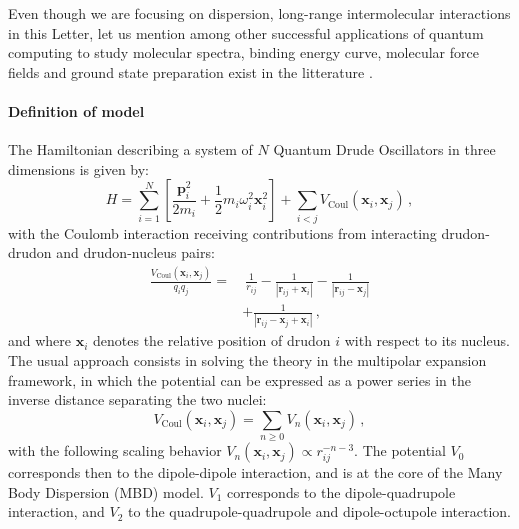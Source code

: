 \documentclass[reprint, amsmath, amssymb, floatfix, aps, pra]{revtex4-2}
\begin{document}
    Even though we are focusing on dispersion, long-range intermolecular interactions in this Letter, let us mention among other successful applications of quantum computing to study molecular spectra, binding energy curve, molecular force fields and ground state preparation exist in the litterature \cite{kiss2022quantum, apanavicius2021morse, wang2009efficient, nam2020ground, romero2018strategies, colless2018computation, kandala2017hardware}.
    \newline
\paragraph*{Definition of model}

        The Hamiltonian describing a system of $N$ Quantum Drude Oscillators in three dimensions is given by:
        \begin{equation*}
            H=\sum_{i=1}^N\left[\frac{\bm{p} _i^2}{2m_i} + \frac{1}{2}m_i\omega_i^2\bm{x} _i^2\right] +\sum_{i<j}V_\text{Coul}\left(\bm{x} _i, \bm{x} _j\right)\,,
        \end{equation*}
        with the Coulomb interaction receiving contributions from interacting drudon-drudon and drudon-nucleus pairs:
        \begin{equation*}
        \begin{split}
            \frac{V_\text{Coul}\left(\bm{x} _i, \bm{x} _j\right)}{q_iq_j}=&\ \frac{1}{r_{ij}} - \frac{1}{|\bm{r}_{ij}
            + \bm{x} _i|} - \frac{1}{|\bm{r}_{ij}  - \bm{x} _j|} \\
            & + \frac{1}{|\bm{r}_{ij} - \bm{x} _j + \bm{x} _i|}\,,
        \end{split}
        \end{equation*}
        and where $\bm x_i$ denotes the relative position of drudon $i$ with respect to its nucleus. The usual approach consists in solving the theory in the multipolar expansion framework, in which the potential can be expressed as a power series in the inverse distance separating the two nuclei:
        \begin{equation*}
            V_\text{Coul}\left(\bm{x} _i, \bm{x} _j\right)= \sum_{n\geq 0} V_n\left(\bm{x} _i, \bm{x} _j\right)\,,
        \end{equation*}
        with the following scaling behavior $V_n\left(\bm{x} _i, \bm{x} _j\right)\propto r_{ij}^{-n-3}$.
        The potential $V_0$ corresponds then to the dipole-dipole interaction, and is at the core of the Many Body Dispersion (MBD) model. $V_1$ corresponds to the dipole-quadrupole interaction, and $V_2$ to the quadrupole-quadrupole and dipole-octupole interaction.
\end{document}
